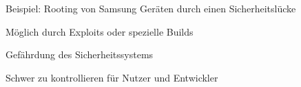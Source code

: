 \begin{frame}
	\centering
	Beispiel: Rooting von Samsung Geräten durch einen Sicherheitslücke

    		\begin{block}{}
				Möglich durch Exploits oder spezielle Builds
			\end{block}
			\begin{block}{}
				Gefährdung des Sicherheitssystems
			\end{block}
			\begin{block}{}
				Schwer zu kontrollieren für Nutzer und Entwickler
			\end{block}


\end{frame}